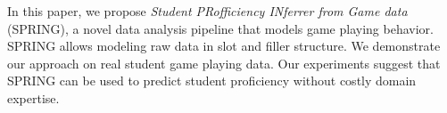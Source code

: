 \documentclass{sigchi}
\def\algname{SPRING\xspace}
\begin{document}
In this paper, we propose \textit{Student PRofficiency INferrer from Game data} (SPRING), a novel data analysis pipeline that models game playing behavior.
\algname allows modeling raw data in slot and filler structure.
We demonstrate our approach on real student game playing data.
Our experiments suggest that \algname can be used to predict student proficiency  without costly domain expertise.




\end{document}
